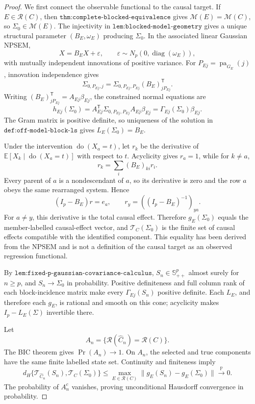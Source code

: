 \documentclass{article}
\begin{document}
\begin{proof}
We first connect the observable functional to the causal target. If \(E\in\mathcal R(C)\), then \(\texttt{thm:complete-blocked-equivalence}\) gives \(\mathcal M(E)=\mathcal M(C)\), so \(\Sigma_0\in\mathcal M(E)\). The injectivity in \(\texttt{lem:blocked-model-geometry}\) gives a unique structural parameter \((B_E,\omega_E)\) producing \(\Sigma_0\). In the associated linear Gaussian NPSEM,
\[
 X=B_EX+\varepsilon,
 \qquad \varepsilon\sim N_p(0,\operatorname{diag}(\omega_E)),
\]
with mutually independent innovations of positive variance. For \(P_{Ej}=\operatorname{pa}_{G_E}(j)\), innovation independence gives
\[
 \Sigma_{0,P_{Ej},j}
 =\Sigma_{0,P_{Ej},P_{Ej}}(B_E)_{jP_{Ej}}^{\mathsf T}.
\]
Writing \((B_E)_{jP_{Ej}}^{\mathsf T}=A_{Ej}\beta_{Ej}\), the constrained normal equations are
\[
 h_{Ej}(\Sigma_0)
 =A_{Ej}^{\mathsf T}\Sigma_{0,P_{Ej},P_{Ej}}A_{Ej}\beta_{Ej}
 =\Gamma_{Ej}(\Sigma_0)\beta_{Ej}.
\]
The Gram matrix is positive definite, so uniqueness of the solution in \(\texttt{def:off-model-block-ls}\) gives \(L_E(\Sigma_0)=B_E\).

Under the intervention \(\operatorname{do}(X_a=t)\), let \(r_k\) be the derivative of \(\mathbb E[X_k\mid\operatorname{do}(X_a=t)]\) with respect to \(t\). Acyclicity gives \(r_a=1\), while for \(k\neq a\),
\[
 r_k=\sum_i(B_E)_{ki}r_i.
\]
Every parent of \(a\) is a nondescendant of \(a\), so its derivative is zero and the row \(a\) obeys the same rearranged system. Hence
\[
 (I_p-B_E)r=e_a,
 \qquad
 r_y=((I_p-B_E)^{-1})_{ya}.
\]
For \(a\neq y\), this derivative is the total causal effect. Therefore \(g_E(\Sigma_0)\) equals the member-labelled causal-effect vector, and \(\mathcal T_C(\Sigma_0)\) is the finite set of causal effects compatible with the identified component. This equality has been derived from the NPSEM and is not a definition of the causal target as an observed regression functional.

By \(\texttt{lem:fixed-p-gaussian-covariance-calculus}\), \(S_n\in\mathbb S^p_{++}\) almost surely for \(n\geq p\), and \(S_n\to\Sigma_0\) in probability. Positive definiteness and full column rank of each block-incidence matrix make every \(\Gamma_{Ej}(S_n)\) positive definite. Each \(L_E\), and therefore each \(g_E\), is rational and smooth on this cone; acyclicity makes \(I_p-L_E(\Sigma)\) invertible there.

Let
\[
 A_n=\{\mathcal R(\widehat C_n)=\mathcal R(C)\}.
\]
The BIC theorem gives \(\Pr(A_n)\to1\). On \(A_n\), the selected and true components have the same finite labelled state set. Continuity and finiteness imply
\[
 d_H\{\mathcal T_{\widehat C_n}(S_n),\mathcal T_C(\Sigma_0)\}
 \leq\max_{E\in\mathcal R(C)}
 \|g_E(S_n)-g_E(\Sigma_0)\|
 \xrightarrow{\mathbb P}0.
\]
The probability of \(A_n^c\) vanishes, proving unconditional Hausdorff convergence in probability.


\end{proof}
\end{document}
